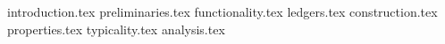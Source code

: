 {introduction.tex}
{preliminaries.tex}
{functionality.tex}
{ledgers.tex}
{construction.tex}
{properties.tex}
{typicality.tex}
{analysis.tex}
